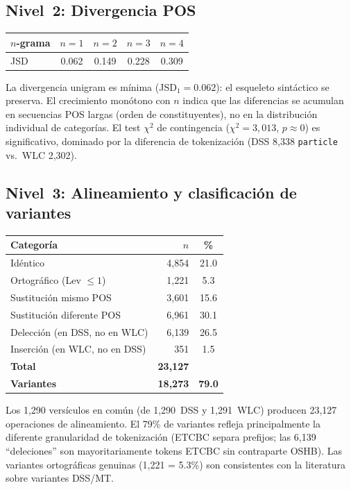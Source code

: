 \documentclass[12pt,a4paper]{article}
\begin{document}
\subsection{Nivel~2: Divergencia POS}

\begin{center}
\begin{tabular}{lcccc}
\toprule
\textbf{$n$-grama} & $n=1$ & $n=2$ & $n=3$ & $n=4$ \\
\midrule
JSD & 0.062 & 0.149 & 0.228 & 0.309 \\
\bottomrule
\end{tabular}
\end{center}

La divergencia unigram es m\'inima (JSD$_1 = 0.062$): el esqueleto sint\'actico se
preserva. El crecimiento mon\'otono con $n$ indica que las diferencias se acumulan
en secuencias POS largas (orden de constituyentes), no en la distribuci\'on
individual de categor\'ias. El test $\chi^2$ de contingencia ($\chi^2 = 3{,}013$,
$p \approx 0$) es significativo, dominado por la diferencia de tokenizaci\'on
(DSS 8,338 \texttt{particle} vs.\ WLC 2,302).


\subsection{Nivel~3: Alineamiento y clasificaci\'on de variantes}

\begin{center}
\begin{tabular}{lrc}
\toprule
\textbf{Categor\'ia} & \textbf{$n$} & \textbf{\%} \\
\midrule
Id\'entico & 4,854 & 21.0 \\
Ortogr\'afico (Lev $\leq 1$) & 1,221 & 5.3 \\
Sustituci\'on mismo POS & 3,601 & 15.6 \\
Sustituci\'on diferente POS & 6,961 & 30.1 \\
Delecci\'on (en DSS, no en WLC) & 6,139 & 26.5 \\
Inserci\'on (en WLC, no en DSS) & 351 & 1.5 \\
\midrule
\textbf{Total} & \textbf{23,127} & \\
\textbf{Variantes} & \textbf{18,273} & \textbf{79.0} \\
\bottomrule
\end{tabular}
\end{center}

Los 1,290 vers\'iculos en com\'un (de 1,290~DSS y 1,291~WLC) producen 23,127
operaciones de alineamiento. El 79\% de variantes refleja principalmente
la diferente granularidad de tokenizaci\'on (ETCBC separa prefijos;
las 6,139 ``deleciones'' son mayoritariamente tokens ETCBC sin contraparte OSHB).
Las variantes ortogr\'aficas genuinas (1,221 = 5.3\%) son consistentes con la
literatura sobre variantes DSS/MT.
\end{document}
